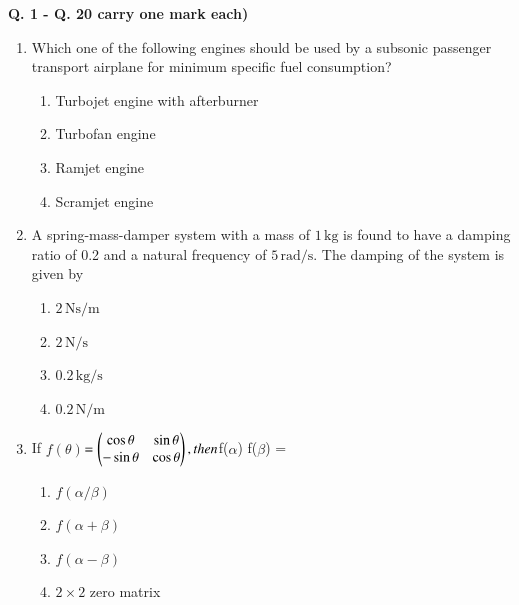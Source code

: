\documentclass{article}
\begin{document}
\newpage

\begin{center}
    \textbf{Q. 1 - Q. 20 carry one mark each)}
\end{center}

\begin{enumerate}
    \item Which one of the following engines should be used by a subsonic passenger transport airplane for minimum specific fuel consumption?
    \begin{enumerate}
        \item Turbojet engine with afterburner
        \item Turbofan engine
        \item Ramjet engine
        \item Scramjet engine
    \end{enumerate}
    

    \item A spring-mass-damper system with a mass of $1 \, \mathrm{kg}$ is found to have a damping ratio of 0.2 and a natural frequency of $5 \, \mathrm{rad/s}$. The damping of the system is given by 
    \begin{multicols}{4}
    \begin{enumerate}
        \item $2 \, \mathrm{Ns/m}$ 
        \item $2 \, \mathrm{N/s}$ 
        \item $0.2 \, \mathrm{kg/s}$ 
        \item $0.2 \, \mathrm{N/m}$
    \end{enumerate}
    \end{multicols}
        

    \item If $f(\theta)$$ = \begin{pmatrix}\cos\theta & \sin\theta \\
        -\sin\theta & \cos\theta\end{pmatrix}, \space then $f($\alpha$) f($\beta$) = 
    \begin{multicols}{2}
    \begin{enumerate}
        \item $f(\alpha/\beta)$ 
        \item $f(\alpha + \beta)$ 
        \item $f(\alpha - \beta)$ 
        \item $2 \times 2$ zero matrix
    \end{enumerate}
    \end{multicols}



\end{enumerate}
\end{document}
